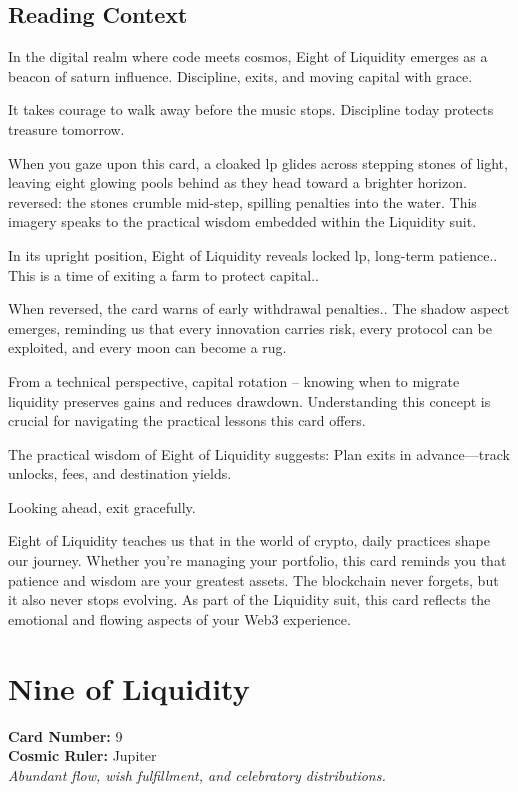 \documentclass[11pt,oneside]{book}
\begin{document}
\begin{minipage}[t]{0.55\textwidth}
  \subsection*{Reading Context}
  In the digital realm where code meets cosmos, Eight of Liquidity emerges as a beacon of saturn influence. Discipline, exits, and moving capital with grace.

  It takes courage to walk away before the music stops. Discipline today protects treasure tomorrow.

  When you gaze upon this card, a cloaked lp glides across stepping stones of light, leaving eight glowing pools behind as they head toward a brighter horizon. reversed: the stones crumble mid-step, spilling penalties into the water. This imagery speaks to the practical wisdom embedded within the Liquidity suit.

  In its upright position, Eight of Liquidity reveals locked lp, long-term patience.. This is a time of exiting a farm to protect capital..

  When reversed, the card warns of early withdrawal penalties.. The shadow aspect emerges, reminding us that every innovation carries risk, every protocol can be exploited, and every moon can become a rug.

  From a technical perspective, capital rotation – knowing when to migrate liquidity preserves gains and reduces drawdown. Understanding this concept is crucial for navigating the practical lessons this card offers.

  The practical wisdom of Eight of Liquidity suggests: Plan exits in advance—track unlocks, fees, and destination yields.

  Looking ahead, exit gracefully.

  Eight of Liquidity teaches us that in the world of crypto, daily practices shape our journey. Whether you're managing your portfolio, this card reminds you that patience and wisdom are your greatest assets. The blockchain never forgets, but it also never stops evolving. As part of the Liquidity suit, this card reflects the emotional and flowing aspects of your Web3 experience.

\end{minipage}

\newpage
\section*{Nine of Liquidity}

\begin{minipage}[t]{0.55\textwidth}
  \vspace{0pt}
  \textbf{Card Number:} 9\\  \textbf{Cosmic Ruler:} Jupiter\\  \textit{Abundant flow, wish fulfillment, and celebratory distributions.}
\end{minipage}
\end{document}
